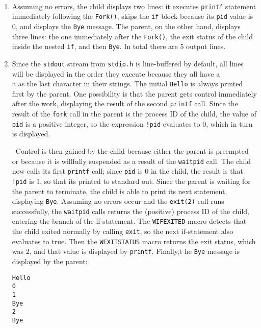 \documentclass[12pt]{article}
\newenvironment{sol}[1][Solution]{\begin{trivlist}
		\item[\hskip \labelsep {\bfseries #1:}]}{\end{trivlist}}
\begin{document}
\begin{sol}
	\
	\begin{enumerate}[label=(\alph*)]
		\item Assuming no errors, the child displays two lines: it executes \texttt{printf}
		statement immediately following the \texttt{Fork()}, skips the \texttt{if} block
		because its \texttt{pid} value is 0, and displays the \texttt{Bye} message.
		The parent, on the other hand, displays three lines: the one immediately after the
		\texttt{Fork()}, the exit status of the child inside the nested \texttt{if}, and
		then \texttt{Bye}. In total there are 5 output lines.
		\item Since the \texttt{stdout} stream from \texttt{stdio.h} is line-buffered by default, all
		lines will be displayed in the order they execute because they all have a \texttt{\\n} as
		the last character in their strings. The initial \texttt{Hello} is always printed first by the parent. One possibility is that the parent gets control immediately after the work,
		displaying the result of the second \texttt{printf} call. Since the result of the \texttt{fork}
		call in the parent is the process ID of the child, the value of \texttt{pid} is a positive
		integer, so the expression \texttt{!pid} evaluates to 0, which in turn is displayed.
		
		\
		Control is then gained by the child because either the parent is preempted or because
		it is willfully suspended as a result of the \texttt{waitpid} call. The child now
		calls its first \texttt{printf} call; since \texttt{pid} is 0 in the child, the
		result is that \texttt{!pid} is 1, so that its printed to standard out. Since the
		parent is waiting for the parent to terminate, the child is able to print its next
		statement, displaying \texttt{Bye}. Assuming no errors occur and the \texttt{exit(2)}
		call runs successfully, the \texttt{waitpid} calls returns the (positive) process ID
		of the child, entering the branch of the if-statement. The \texttt{WIFEXITED} macro
		detects that the child exited normally by calling \texttt{exit}, so the next
		if-statement also evaluates to true. Then the \texttt{WEXITSTATUS} macro returns
		the exit status, which was 2, and that value is displayed by \texttt{printf}.
		Finally,t he \texttt{Bye} message is displayed by the parent:
		\begin{lstlisting}[language={}]
Hello
0
1
Bye
2
Bye
		\end{lstlisting}
	\end{enumerate}
\end{sol}
\end{document}
